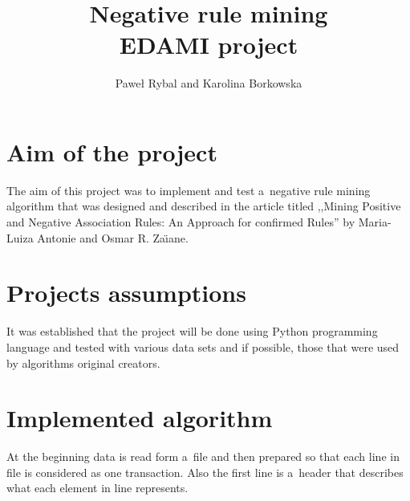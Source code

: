 \documentclass{article}
\date{}
\author{Paweł Rybal and Karolina Borkowska}
\title{Negative rule mining\\
	{\large EDAMI project}}
\begin{document}
 	\maketitle
 	\section{Aim of the project}
 	The aim of this project was to implement and test a~negative rule mining algorithm that was designed and described in the article titled ,,Mining Positive and Negative Association Rules: An Approach for confirmed Rules'' by Maria-Luiza Antonie and Osmar R. Za\"{\i}ane.
 	
 	\section{Projects assumptions}
 	It was established that the project will be done using Python programming language and tested with various data sets and if possible, those that were used by algorithms original creators.
 	
 	\section{Implemented algorithm}
	At the beginning data is read form a~file and then prepared so that each line in file is considered as one transaction. Also the first line is a~header that describes what each element in line represents.
	
\end{document}
